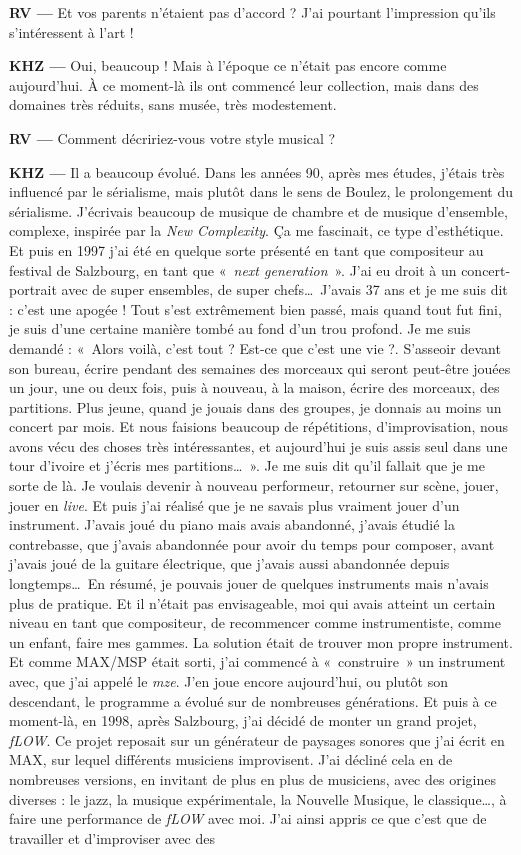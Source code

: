 \documentclass[a4paper,12pt]{article}
\newcommand{\guill}[1]{«~#1~»}
\newcommand{\maze}[0]{\emph{m\symbol{64}ze\textdegree2}}
\begin{document}
\textbf{RV ---} Et vos parents n'étaient pas d'accord ? J'ai pourtant l'impression qu'ils s'intéressent à l'art !

\textbf{KHZ ---} Oui, beaucoup ! Mais à l'époque ce n'était pas encore comme aujourd'hui. À ce moment-là ils ont commencé leur collection, mais dans des domaines très réduits, sans musée, très modestement.

\textbf{RV ---} Comment décririez-vous votre style musical ?

\textbf{KHZ ---} Il a beaucoup évolué. Dans les années 90, après mes études, j'étais très influencé par le sérialisme, mais plutôt dans le sens de Boulez, le prolongement du sérialisme. J'écrivais beaucoup de musique de chambre et de musique d'ensemble, complexe, inspirée par la \emph{New Complexity}. Ça me fascinait, ce type d'esthétique. Et puis en 1997 j'ai été en quelque sorte présenté en tant que compositeur au festival de Salzbourg, en tant que \guill{\emph{next generation}}. J'ai eu droit à un concert-portrait avec de super ensembles, de super chefs\dots~J'avais 37 ans et je me suis dit : c'est une apogée ! Tout s'est extrêmement bien passé, mais quand tout fut fini, je suis d'une certaine manière tombé au fond d'un trou profond. Je me suis demandé : \guill{Alors voilà, c'est tout ? Est-ce que c'est une vie ?. S'asseoir devant son bureau, écrire pendant des semaines des morceaux qui seront peut-être jouées un jour, une ou deux fois, puis à nouveau, à la maison, écrire des morceaux, des partitions. Plus jeune, quand je jouais dans des groupes, je donnais au moins un concert par mois. Et nous faisions beaucoup de répétitions, d'improvisation, nous avons vécu des choses très intéressantes, et aujourd'hui je suis assis seul dans une tour d'ivoire et j'écris mes partitions\dots}. Je me suis dit qu'il fallait que je me sorte de là. Je voulais devenir à nouveau performeur, retourner sur scène, jouer, jouer en \emph{live}. Et puis j'ai réalisé que je ne savais plus vraiment jouer d'un instrument. J'avais joué du piano mais avais abandonné, j'avais étudié la contrebasse, que j'avais abandonnée pour avoir du temps pour composer, avant j'avais joué de la guitare électrique, que j'avais aussi abandonnée depuis longtemps\dots~En résumé, je pouvais jouer de quelques instruments mais n'avais plus de pratique. Et il n'était pas envisageable, moi qui avais atteint un certain niveau en tant que compositeur, de recommencer comme instrumentiste, comme un enfant, faire mes gammes. La solution était de trouver mon propre instrument. Et comme MAX/MSP était sorti, j'ai commencé à \guill{construire} un instrument avec, que j'ai appelé le \maze. J'en joue encore aujourd'hui, ou plutôt son descendant, le programme a évolué sur de nombreuses générations. Et puis à ce moment-là, en 1998, après Salzbourg, j'ai décidé de monter un grand projet, \emph{fLOW}. Ce projet reposait sur un générateur de paysages sonores que j'ai écrit en MAX, sur lequel différents musiciens improvisent. J'ai décliné cela en de nombreuses versions, en invitant de plus en plus de musiciens, avec des origines diverses : le jazz, la musique expérimentale, la Nouvelle Musique, le classique\dots, à faire une performance de \emph{fLOW} avec moi. J'ai ainsi appris ce que c'est que de travailler et d'improviser avec des 
\end{document}
